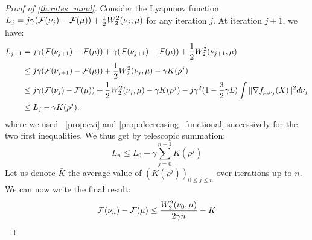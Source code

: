 \begin{proof}[Proof of \cref{th:rates_mmd}]\label{proof:th:rates_mmd}
	Consider the Lyapunov function $L_j = j \gamma ({{\mathcal F}}(\nu_j) - {{\mathcal F}}(\mu)) + \frac12 W_2^2(\nu_j,\mu)$ for any iteration $j$. At iteration $j+1$, we have:
	\begin{align*}
	L_{j+1} &= j\gamma({{\mathcal F}}(\nu_{j+1}) - {{\mathcal F}}(\mu)) + \gamma({{\mathcal F}}(\nu_{j+1}) - {{\mathcal F}}(\mu)) + \frac12 W_2^2(\nu_{j+1},\mu)\\
	&\leq j\gamma({{\mathcal F}}(\nu_{j+1}) - {{\mathcal F}}(\mu)) + \frac12 W_2^2(\nu_j,\mu)-\gamma K(\rho^j)\\
	&\leq j\gamma({{\mathcal F}}(\nu_{j}) - {{\mathcal F}}(\mu)) + \frac12 W_2^2(\nu_j,\mu)-\gamma K(\rho^j) -j\gamma^2 (1-\frac{3}{2} \gamma L )\int \Vert \nabla f_{\mu, \nu_j}(X)\Vert^2 d\nu_j \\
	&\leq  L_j - \gamma K(\rho^j).
	\end{align*}
	where we used ~\cref{prop:evi} and \cref{prop:decreasing_functional} successively for the two first inequalities. We thus get by telescopic summation: 
	\begin{equation}
	 L_n \leq L_0 -\gamma \sum_{j = 0}^{n-1} K(\rho^j)
	\end{equation}
		Let us denote $\bar{K}$ the average value of $(K(\rho^j))_{0\leq j \leq n}$ over iterations up to $n$. We can now write the final result:
	\begin{equation}
	{{\mathcal F}}(\nu_{n}) - {{\mathcal F}}(\mu) \leq \frac{W_2^2(\nu_0, \mu)}{2 \gamma n} -\bar{K}
	\end{equation}
\end{proof}





